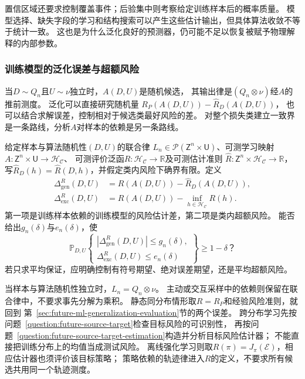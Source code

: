 置信区域还要求控制覆盖事件；后验集中则考察给定训练样本后的概率质量。
模型选择、缺失字段的学习和结构搜索可以产生这些估计输出，但具体算法收敛不等于统计一致。
这也是为什么泛化良好的预测器，仍可能不足以恢复被赋予物理解释的内部参数。

\subsubsection{训练模型的泛化误差与超额风险}
\label{sec:future-analysis-learned-risk}

当$D\sim Q_n$且$U\sim\nu$独立时，$A(D,U)$是随机候选，
其输出律是$(Q_n\otimes\nu)$经$A$的推前测度。
泛化可以直接研究随机量
$R_P(A(D,U))-\widehat R_D(A(D,U))$，
也可以结合求解误差，控制相对于候选类最好风险的差。
对整个损失类建立一致界是一条路线，分析$A$对样本的依赖是另一条路线。

\begin{mathproblem}[给定学习规则的泛化与超额风险]
  \label{question:future-learned-risk}
  给定样本与算法随机性$(D,U)$的联合律
  $L_n\in\mathcal P(\mathsf Z^n\times\mathsf U)$、可测学习映射
  $A:\mathsf Z^n\times\mathsf U\to\mathcal H_{\mathcal C}$、
  可测评价泛函$R:\mathcal H_{\mathcal C}\to\mathbb R$及可测估计准则
  $\widehat R:\mathsf Z^n\times\mathcal H_{\mathcal C}\to\mathbb R$，
  写$\widehat R_D(h)=\widehat R(D,h)$，并假定类内风险下确界有限。定义
  \[
    \begin{aligned}
      \Delta_{\mathrm{gen}}^R(D,U)
        &=R(A(D,U))-\widehat R_D(A(D,U)),\\
      \Delta_{\mathrm{exc}}^R(D,U)
        &=R(A(D,U))-\inf_{h\in\mathcal H_{\mathcal C}}R(h).
    \end{aligned}
  \]
  第一项是训练样本依赖的训练模型的风险估计差，第二项是类内超额风险。
  能否给出$g_n(\delta)$与$e_n(\delta)$，使
  \[
    \mathbb P_{D,U}\!\left\{
      \begin{gathered}
        |\Delta_{\mathrm{gen}}^R(D,U)|\leq g_n(\delta),\\
        \Delta_{\mathrm{exc}}^R(D,U)\leq e_n(\delta)
      \end{gathered}
    \right\}\geq1-\delta\text{？}
  \]
  若只求平均保证，应明确控制有符号期望、绝对误差期望，还是平均超额风险。
\end{mathproblem}

当样本与算法随机性独立时，$L_n=Q_n\otimes\nu$。
主动或交互采样中的依赖则保留在联合律中，不要求事先分解为乘积。
静态同分布情形取$R=R_P$和经验风险准则，就回到
第~\ref{sec:future-ml-generalization-evaluation}节的两个误差。
跨分布学习先按问题~\ref{question:future-source-target}检查目标风险的可识别性，
再按问题~\ref{question:future-source-target-estimation}构造并分析目标风险估计器；
不能直接把训练分布上的均值当成测试风险。
离线强化学习则取$R(\pi)=J_\pi(\mathcal E)$，相应估计器也须评价该目标策略；
策略依赖的轨迹律进入$R$的定义，不要求所有候选共用同一个轨迹测度。

